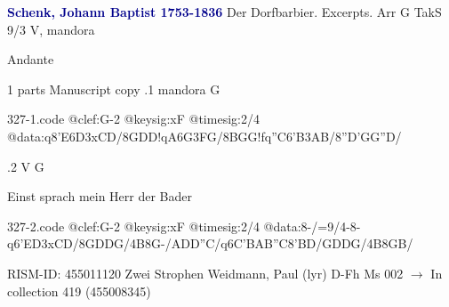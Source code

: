 \documentclass[twocolumn]{book}
\begin{document}
\newline \par \vspace{7pt} \textcolor{darkblue}{\textbf{Schenk, Johann Baptist  1753-1836}}
\newline Der Dorfbarbier. Excerpts. Arr  G  TakS 9/3
\newline V, mandora
\newline \begin{itshape}[at left, f.44v:] Andante\end{itshape} 
\newline \textcolor{darkblue}{}  1 parts  
\newline Manuscript copy
.1  mandora  G  
\begin{filecontents*}{327-1.code}
@clef:G-2
@keysig:xF
@timesig:2/4
@data:q8'E{6D3xCD}/{8GDD}!qA{6G3FG}/{8BGG}!fq''C{6'B3AB}/{8''D'GG''D}/
\end{filecontents*}
\newline
%

.2  V  G
\newline \begin{footnotesize} Einst sprach mein Herr der Bader \end{footnotesize}  
\begin{filecontents*}{327-2.code}
@clef:G-2
@keysig:xF
@timesig:2/4
@data:8-/=9/4-8-q6'E{D3xCD}/{8GDDG}/4B8G-/{ADD''C}/q6C{'BAB''C}{8'BD}/{GDDG}/4B{8GB}/
\end{filecontents*}
\newline
%

\newline RISM-ID: 455011120
\newline Zwei Strophen
\newline Weidmann, Paul  (lyr)
\newline D-Fh  Ms 002
\newline $\rightarrow$ In collection 419 (455008345)
\end{document}
